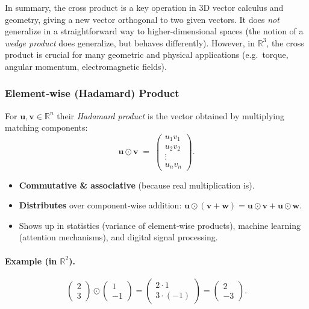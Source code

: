 \noindent
In summary, the cross product is a key operation in 3D vector calculus and geometry, 
giving a new vector orthogonal to two given vectors. 
It does \emph{not} generalize in a straightforward way to higher-dimensional spaces 
(the notion of a \emph{wedge product} does generalize, but behaves differently). 
However, in $\mathbb{R}^3$, the cross product is crucial for many geometric and physical applications 
(e.g.\ torque, angular momentum, electromagnetic fields).
\subsubsection{Element‑wise (Hadamard) Product}
For $\mathbf{u},\mathbf{v}\in\mathbb{R}^n$ their \emph{Hadamard product}  
is the vector obtained by multiplying matching components:
\[
  \mathbf{u}\odot\mathbf{v}
  \;=\;
  \begin{pmatrix}
    u_1v_1 \\ u_2v_2 \\ \vdots \\ u_nv_n
  \end{pmatrix}.
\]

\begin{itemize}
  \item \textbf{Commutative \& associative} (because real multiplication is).
  \item \textbf{Distributes} over component‑wise addition:
        $\mathbf{u}\odot(\mathbf{v}+\mathbf{w})=\mathbf{u}\odot\mathbf{v}+\mathbf{u}\odot\mathbf{w}$.
  \item Shows up in statistics (variance of element‑wise products),  
        machine learning (attention mechanisms), and digital signal processing.
\end{itemize}

\paragraph{Example (in $\mathbb{R}^2$).}
\[
\begin{pmatrix}2\\3\end{pmatrix}\odot
\begin{pmatrix}1\\-1\end{pmatrix}
=
\begin{pmatrix}2\cdot1\\3\cdot(-1)\end{pmatrix}
=
\begin{pmatrix}2\\-3\end{pmatrix}.
\]


